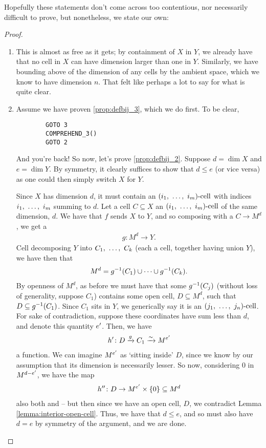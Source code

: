 Hopefully these statements don't come across too contentious, nor necessarily difficult to prove, but nonetheless, we state our own:
\begin{proof}
  \leavevmode
  \begin{enumerate}

    \item This is almost as free as it gets; by containment of $X$ in $Y$, we already have that no cell in $X$ can have dimension larger than one in $Y$. Similarly, we have bounding above of the dimension of any cells by the ambient space, which we know to have dimension $n$. That felt like perhaps a lot to say for what is quite clear.

    \item Assume we have proven \ref{prop:defbij_3}, which we do first. To be clear, 
      \begin{verbatim}
        GOTO 3
        COMPREHEND_3()
        GOTO 2
      \end{verbatim}
    And you're back! So now, let's prove \ref{prop:defbij_2}. Suppose $d = \dim{X}$ and $e = \dim{Y}$. By symmetry, it clearly suffices to show that $d \leq e$ (or vice versa) as one could then simply switch $X$ for $Y$.

    Since $X$ has dimension $d$, it must contain an $(i_1, \ \hdots, \ i_{m})\textrm{-cell}$ with indices $i_1, \ \hdots, \ i_{m}$ summing to $d$. Let a cell $C \subseteq X$ an $(i_1, \ \hdots, \ i_{m})\textrm{-cell}$ of the same dimension, $d$. We have that $f$ sends $X$ to $Y$, and so composing with a  \bij $C \to M^d$, we get a  \injtion
    \begin{align*}
      g \colon M^d \to Y.
    \end{align*}
    Cell decomposing $Y$ into $C_1, \ \hdots, \ C_{k}$ (each a cell, together having union $Y$), we have then that
    \begin{align*}
      M^d = g^{-1}(C_1) \cup \cdots \cup g^{-1}(C_k).
    \end{align*}
    By openness of $M^d$, as before we must have that some $g^{-1}(C_j)$ (without loss of generality, suppose $C_1$) contains some open cell, $D \subseteq M^d$, such that $D \subseteq g^{-1}(C_1)$. Since $C_1$ sits in $Y$, we generically say it is an $(j_1, \ \hdots, \ j_{n})\textrm{-cell}$. For sake of contradiction, suppose these coordinates have sum less than $d$, and denote this quantity $e^{\prime}$. Then, we have
    \begin{align*}
      h^{\prime} \colon D \xrightarrow{g} C_1 \xrightarrow{\sim} M^{e^{\prime}}
    \end{align*}
    a  \inj function. We can imagine $M^{e^{\prime}}$ as `sitting inside' $D$, since we know by our assumption that its dimension is necessarily lesser. So now, considering $0$ in $M^{d - e^{\prime}}$, we have the map
    \begin{align*}
      h^{\prime \prime} \colon D \to M^{e^{\prime}} \times \left\{ 0 \right\} \subseteq M^d
    \end{align*}
    also both  and \inj -- but then since we have an open cell, $D$, we contradict Lemma \ref{lemma:interior-open-cell}. Thus, we have that $d \leq e$, and so must also have $d = e$ by symmetry of the argument, and we are done.


\end{enumerate}
\end{proof}
